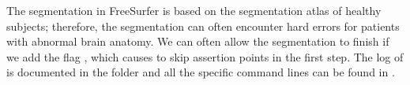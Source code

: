 The segmentation in FreeSurfer is based on the segmentation atlas of
healthy subjects; therefore, the segmentation can often encounter hard
errors for patients with abnormal brain anatomy. We can often allow
the segmentation to finish if we add the flag ,
which causes  to skip assertion points in the first step. The
log of  is documented in the folder 
and all the specific command lines can be found in .



